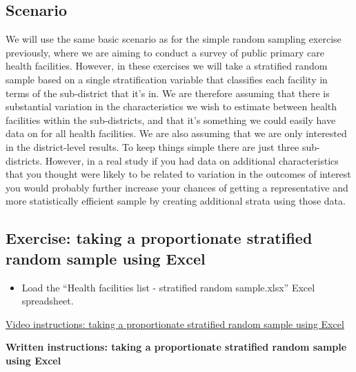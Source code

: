 \documentclass[
]{book}
\providecommand{\tightlist}{%
  \setlength{\itemsep}{0pt}\setlength{\parskip}{0pt}}
\begin{document}
\hypertarget{scenario-1}{%
\subsection{Scenario}\label{scenario-1}}

We will use the same basic scenario as for the simple random sampling exercise previously, where we are aiming to conduct a survey of public primary care health facilities. However, in these exercises we will take a stratified random sample based on a single stratification variable that classifies each facility in terms of the sub-district that it's in. We are therefore assuming that there is substantial variation in the characteristics we wish to estimate between health facilities within the sub-districts, and that it's something we could easily have data on for all health facilities. We are also assuming that we are only interested in the district-level results. To keep things simple there are just three sub-districts. However, in a real study if you had data on additional characteristics that you thought were likely to be related to variation in the outcomes of interest you would probably further increase your chances of getting a representative and more statistically efficient sample by creating additional strata using those data.

\hypertarget{exercise-taking-a-proportionate-stratified-random-sample-using-excel}{%
\subsection{Exercise: taking a proportionate stratified random sample using Excel}\label{exercise-taking-a-proportionate-stratified-random-sample-using-excel}}

\begin{itemize}
\tightlist
\item
  Load the ``Health facilities list - stratified random sample.xlsx'' Excel spreadsheet.
\end{itemize}

\href{https://youtu.be/x0kI-hybJh0}{Video instructions: taking a proportionate stratified random sample using Excel}

\textbf{Written instructions: taking a proportionate stratified random sample using Excel}
\end{document}
